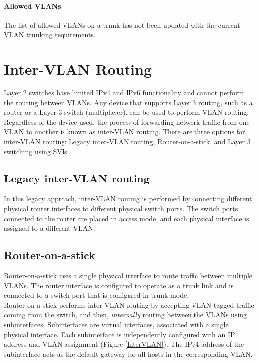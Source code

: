 \paragraph{Allowed VLANs} The list of allowed VLANs on a trunk has not been updated with the current VLAN trunking requirements. 

\section{Inter-VLAN Routing}

Layer 2 switches have limited IPv4 and IPv6 functionality and cannot perform the routing between VLANs. Any device that supports Layer 3 routing, such as a router or a Layer 3 switch (multiplayer), can be used to perform VLAN routing. Regardless of the device used, the process of forwarding network traffic from one VLAN to another is known as inter-VLAN routing. There are three options for inter-VLAN routing: Legacy inter-VLAN routing, Router-on-a-stick, and Layer 3 switching using SVIs.

\subsection{Legacy inter-VLAN routing}

In this legacy approach, inter-VLAN routing is performed by connecting different physical router interfaces to different physical switch ports. The switch ports connected to the router are placed in access mode, and each physical interface is assigned to a different VLAN.

\subsection{Router-on-a-stick}

Router-on-a-stick uses a single physical interface to route traffic between multiple VLANs. The router interface is configured to operate as a trunk link and is connected to a switch port that is configured in trunk mode. \\

Router-on-a-stick performs inter-VLAN routing by accepting VLAN-tagged traffic coming from the switch, and then, \emph{internally} routing between the VLANs using subinterfaces. Subinterfaces are virtual interfaces, associated with a single physical interface. Each subinterface is independently configured with an IP address and VLAN assignment (Figure \ref{InterVLAN}). The IPv4 address of the subinterface acts as the default gateway for all hosts in the corresponding VLAN.\\

